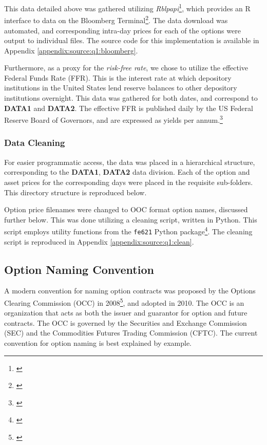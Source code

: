 \documentclass[10pt]{article}
\begin{document}
    This data detailed above was gathered utilizing \textit{Rblpapi}\footnote{\cite{Armstrong2018}}, which provides an R interface to data on the Bloomberg Terminal\footnote{\cite{BloombergL.P.2019}}. The data download was automated, and corresponding intra-day prices for each of the options were output to individual files. The source code for this implementation is available in Appendix \ref{appendix:source:q1:bloomberg}.

    Furthermore, as a proxy for the \textit{risk-free rate}, we chose to utilize the effective Federal Funds Rate (FFR). This is the interest rate at which depository institutions in the United States lend reserve balances to other depository institutions overnight. This data was gathered for both dates, and correspond to \textbf{DATA1} and \textbf{DATA2}. The effective FFR is published daily by the US Federal Reserve Board of Governors, and are expressed as yields per annum.\footnote{\cite{BoardofGovernorsoftheFederalReserveSystem2019}}

        \subsubsection{Data Cleaning}

            For easier programmatic access, the data was placed in a hierarchical structure, corresponding to the \textbf{DATA1}, \textbf{DATA2} data division. Each of the option and asset prices for the corresponding days were placed in the requisite sub-folders. This directory structure is reproduced below.


            Option price filenames were changed to OOC format option names, discussed further below. This was done utilizing a cleaning script, written in Python. This script employs utility functions from the \texttt{fe621} Python package\footnote{\cite{Weerawarana2019}}. The cleaning script is reproduced in Appendix \ref{appendix:source:q1:clean}.
    
        \subsection{Option Naming Convention}

        A modern convention for naming option contracts was proposed by the Options Clearing Commission (OCC) in 2008\footnote{\cite{OptionsSymbologyInitiative2008}}, and adopted in 2010. The OCC is an organization that acts as both the issuer and guarantor for option and future contracts. The OCC is governed by the Securities and Exchange Commission (SEC) and the Commodities Futures Trading Commission (CFTC). The current convention for option naming is best explained by example.
        
\end{document}
